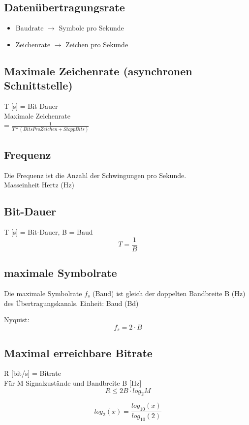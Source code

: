 \subsection{Datenübertragungsrate}{
    \begin{itemize}[noitemsep]
        \item Baudrate $\to$ Symbole pro Sekunde
        \item Zeichenrate $\to$ Zeichen pro Sekunde
    \end{itemize}

}
\subsection{Maximale Zeichenrate (asynchronen Schnittstelle)}{
    T [s] = Bit-Dauer \\
    Maximale Zeichenrate \\ = \LARGE $\frac{1}{T*(BitsProZeichen + StoppBits)} $
}



\subsection{Frequenz}{
    {Die Frequenz ist die Anzahl der Schwingungen pro Sekunde.\\
            Masseinheit Hertz (Hz)\\}
}

\subsection{Bit-Dauer }
{  T [s] = Bit-Dauer, B = Baud \\}
$$ T = \frac{1}{B}$$


\subsection{maximale Symbolrate}
{    Die maximale Symbolrate $f_s$ (Baud) ist gleich der doppelten Bandbreite B (Hz) des
    Übertragungskanals.
}
{Einheit: Baud (Bd)}

{Nyquist:}
$$ f_s = 2 \cdot B$$

\subsection{Maximal erreichbare Bitrate}{
R [bit/s] = Bitrate \\ {Für M Signalzustände und Bandbreite B [Hz]}  \\
$$ R \leq 2B \cdot log_2{M} $$

$$ log_2(x) = \frac{log_{10}(x)}{log_{10}(2)} $$
}



